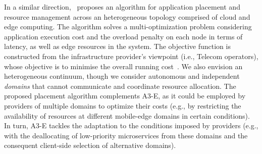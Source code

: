 

In a similar direction,~\cite{Tarneberg2017} proposes an algorithm for application placement and resource management across an heterogeneous topology comprised of cloud and edge computing. 
The algorithm solves a multi-optimization problem considering application
execution cost and the overload penalty on each node in terms of latency, as well as edge
resources in the system. The objective function is constructed
from the infrastructure provider's viewpoint (i.e., Telecom operators), whose objective is to
minimise the overall running cost~\cite{weber2017facilitating}. We also envision an heterogeneous continuum, though we consider autonomous and independent \textit{domains} that cannot communicate and coordinate resource allocation. The proposed placement algorithm complements A3-E, as it could be employed by providers of multiple domains to optimize their costs (e.g., by restricting the availability of resources at different mobile-edge domains in certain conditions). In turn, A3-E tackles the adaptation to the conditions imposed by providers (e.g., with the deallocating of low-priority microservices from these domains and the consequent client-side selection of alternative domains).

